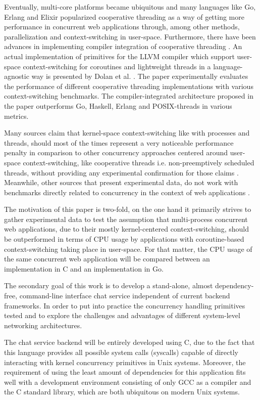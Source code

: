Eventually, multi-core platforms became ubiquitous and many languages like Go, Erlang and Elixir popularized cooperative threading as a way of getting more performance in concurrent web applications through, among other methods, parallelization and context-switching in user-space. Furthermore, there have been advances in implementing compiler integration of cooperative threading \cite{2013ContextSwitching}\cite{2008Pekka}. An actual implementation of primitives for the LLVM compiler which support user-space context-switching for coroutines and lightweight threads in a language-agnostic way is presented by Dolan et al. \cite{2013ContextSwitching}. The paper experimentally evaluates the performance of different cooperative threading implementations with various context-switching benchmarks. The compiler-integrated architecture proposed in the paper outperforms Go, Haskell, Erlang and POSIX-threads in various metrics. 

Many sources claim that kernel-space context-switching like with processes and threads, should most of the times represent a very noticeable performance penalty in comparison to other concurrency approaches centered around user-space context-switching, like cooperative threads i.e. non-preemptively scheduled threads, without providing any experimental confirmation for those claims \cite{2003Events}\cite{2005Threads}\cite{Cox-Buday2017}\cite{Kerrisk2010}. Meanwhile, other sources that present experimental data, do not work with benchmarks directly related to concurrency in the context of web applications \cite{2013ContextSwitching}\cite{2008Pekka}. 

The motivation of this paper is two-fold, on the one hand it primarily strives to gather experimental data to test the assumption that multi-process concurrent web applications, due to their mostly kernel-centered context-switching, should be outperformed in terms of CPU usage by applications with coroutine-based context-switching taking place in user-space. For that matter, the CPU usage of the same concurrent web application will be compared between an implementation in C and an implementation in Go.

The secondary goal of this work is to develop a stand-alone, almost dependency-free, command-line interface chat service independent of current backend frameworks. In order to put into practice the concurrency handling primitives tested and to explore the challenges and advantages of different system-level networking architectures.

The chat service backend will be entirely developed using C, due to the fact that this language provides all possible system calls (syscalls) capable of directly interacting with kernel concurrency primitives in Unix systems. Moreover, the requirement of using the least amount of dependencies for this application fits well with a development environment consisting of only GCC as a compiler and the C standard library, which are both ubiquitous on modern Unix systems. 

